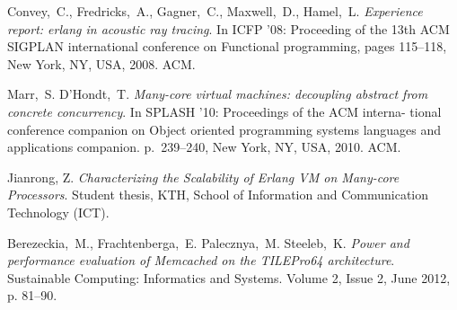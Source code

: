 \documentclass[english,11pt]{article}
\begin{document}
\begin{thebibliography}{99}
     Convey,~C., Fredricks,~A., Gagner,~C.,
        Maxwell,~D., Hamel,~L. \emph{Experience report: erlang in acoustic ray
        tracing}. In ICFP ’08: Proceeding of the 13th ACM SIGPLAN international
        conference on Functional programming, pages 115–118, New York, NY, USA,
        2008. ACM.

     Marr,~S. D’Hondt,~T. \emph{Many-core virtual machines:
        decoupling abstract from concrete concurrency}. In SPLASH ’10:
        Proceedings of the ACM interna- tional conference companion on Object
        oriented programming systems languages and applications companion.
        p.~239–240, New York, NY, USA, 2010. ACM.

     Jianrong, Z. \emph{Characterizing the
        Scalability of Erlang VM on Many-core Processors}. Student thesis, KTH,
        School of Information and Communication Technology (ICT).

     Berezeckia,~M., Frachtenberga,~E. Palecznya,~M.
        Steeleb,~K. \emph{Power and performance evaluation of Memcached on the
        TILEPro64 architecture}. Sustainable Computing: Informatics and Systems.
        Volume 2, Issue 2, June 2012, p. 81–90.

\end{thebibliography}
\end{document}

